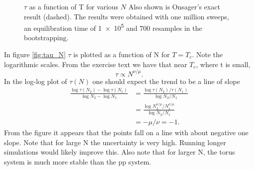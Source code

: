 \documentclass[12pt, a4paper]{article}
\begin{document}
\begin{figure}[H]
  \centering
  \caption{$\tau$ as a function of T for various $N$
    Also shown is Onsager's exact result (dashed).
    The results were obtained with one million sweeps, an equilibration time of \num{1e5} and 700 resamples in the bootstrapping.
    \label{fig:tau_T}}
\end{figure}


In figure \ref{fig:tau_N} $\tau$ is plotted as a function of N for $T = T_c$.
Note the logarithmic scales.
From the exercise text we have that near $T_c$, where t is small,
\begin{equation}
  \tau \propto N^{\nu/\mu}.
\end{equation}
In the log-log plot of $\tau(N)$ one should expect the trend to be a line of slope
\begin{align}
  \frac{\log\tau(N_2) - \log\tau(N_1)}{\log N_2 - \log N_1}
  &= \frac{\log \tau(N_2)/\tau(N_1)}{\log N_2/N_1} \\
  &= \frac{\log N_2^{\nu/\mu}/N_1^{\nu/\mu}}{\log N_2/N_1}\\
  &= -\mu/\nu = -1.
\end{align}
From the figure it appears that the points fall on a line with about negative one slope.
Note that for large N the uncertainty is very high.
Running longer simulations would likely improve this.
Also note that for larger N, the torus system is much more stable than the pp system.
\end{document}
